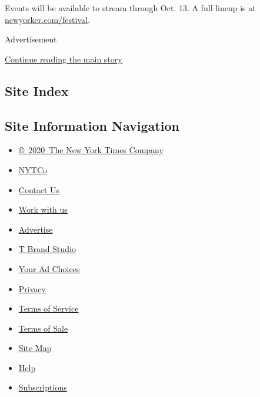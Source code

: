 Events will be available to stream through Oct. 13. A full lineup is at
\href{https://festival.newyorker.com/}{newyorker.com/festival}.

Advertisement

\protect\hyperlink{after-bottom}{Continue reading the main story}

\hypertarget{site-index}{%
\subsection{Site Index}\label{site-index}}

\hypertarget{site-information-navigation}{%
\subsection{Site Information
Navigation}\label{site-information-navigation}}

\begin{itemize}
\tightlist
\item
  \href{https://help.nytimes3xbfgragh.onion/hc/en-us/articles/115014792127-Copyright-notice}{©~2020~The
  New York Times Company}
\end{itemize}

\begin{itemize}
\tightlist
\item
  \href{https://www.nytco.com/}{NYTCo}
\item
  \href{https://help.nytimes3xbfgragh.onion/hc/en-us/articles/115015385887-Contact-Us}{Contact
  Us}
\item
  \href{https://www.nytco.com/careers/}{Work with us}
\item
  \href{https://nytmediakit.com/}{Advertise}
\item
  \href{http://www.tbrandstudio.com/}{T Brand Studio}
\item
  \href{https://www.nytimes3xbfgragh.onion/privacy/cookie-policy\#how-do-i-manage-trackers}{Your
  Ad Choices}
\item
  \href{https://www.nytimes3xbfgragh.onion/privacy}{Privacy}
\item
  \href{https://help.nytimes3xbfgragh.onion/hc/en-us/articles/115014893428-Terms-of-service}{Terms
  of Service}
\item
  \href{https://help.nytimes3xbfgragh.onion/hc/en-us/articles/115014893968-Terms-of-sale}{Terms
  of Sale}
\item
  \href{https://spiderbites.nytimes3xbfgragh.onion}{Site Map}
\item
  \href{https://help.nytimes3xbfgragh.onion/hc/en-us}{Help}
\item
  \href{https://www.nytimes3xbfgragh.onion/subscription?campaignId=37WXW}{Subscriptions}
\end{itemize}
